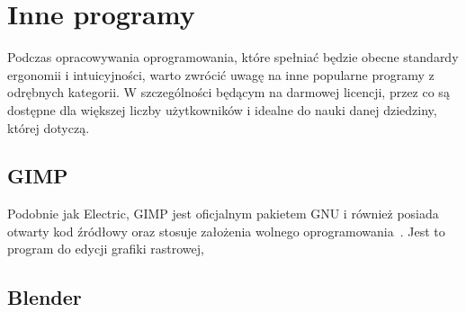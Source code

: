 \section{Inne programy}
\label{sec:inne_programy}

Podczas opracowywania oprogramowania,
które spełniać będzie obecne standardy ergonomii i intuicyjności,
warto zwrócić uwagę na inne popularne programy z odrębnych kategorii.
W szczególności będącym na darmowej licencji,
przez co są dostępne dla większej liczby użytkowników
i idealne do nauki danej dziedziny, której dotyczą.

\subsection{GIMP}

Podobnie jak Electric, GIMP jest oficjalnym pakietem GNU i również posiada otwarty kod źródłowy
oraz stosuje założenia wolnego oprogramowania~\cite{gimp_site}.
Jest to program do edycji grafiki rastrowej, \todo

\subsection{Blender}

